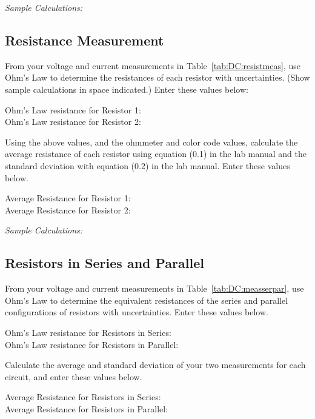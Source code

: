 \noindent
{\it Sample Calculations:}


\subsection{Resistance Measurement}

\noindent
From your voltage and current measurements in Table~\ref{tab:DC:resistmeas},
use Ohm's Law to determine the resistances of each resistor with uncertainties.
(Show sample calculations in space indicated.) Enter these values below:

\begin{center}
Ohm's Law resistance for Resistor 1:\\
Ohm's Law resistance for Resistor 2:
\end{center}
 
\noindent
Using the above values, and the ohmmeter and color code values, calculate the 
average resistance of each resistor using 
equation (0.1) in the lab manual and the standard deviation with 
equation (0.2) in the lab manual.  Enter these values below.

\begin{center}
Average Resistance for Resistor 1:\\
Average Resistance for Resistor 2:
\end{center}

\noindent
{\it Sample Calculations:} 



\newpage
\subsection{Resistors in Series and Parallel}

\noindent
From your voltage and current measurements in Table~\ref{tab:DC:measserpar},
use Ohm's Law to determine the equivalent resistances of the series and
parallel configurations of resistors with uncertainties. Enter these values below. 

\begin{center}
Ohm's Law resistance for Resistors in Series:\\
Ohm's Law resistance for Resistors in Parallel:
\end{center}
 
\noindent
Calculate the average and standard deviation of your two measurements for each
circuit, and enter these values below.

\begin{center}
Average Resistance for Resistors in Series:\\
Average Resistance for Resistors in Parallel:
\end{center} 

